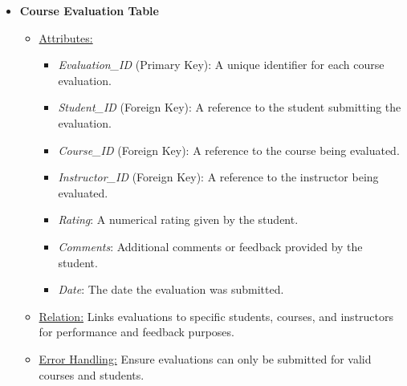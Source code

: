 \documentclass[12pt]{article}
\begin{document}
\begin{itemize}
    \item \textbf{Course Evaluation Table}
    \begin{itemize}
        \item \underline{Attributes:}
        \begin{itemize}
            \item \textit{Evaluation\_ID} (Primary Key): A unique identifier for each course evaluation.
            \item \textit{Student\_ID} (Foreign Key): A reference to the student submitting the evaluation.
            \item \textit{Course\_ID} (Foreign Key): A reference to the course being evaluated.
            \item \textit{Instructor\_ID} (Foreign Key): A reference to the instructor being evaluated.
            \item \textit{Rating}: A numerical rating given by the student.
            \item \textit{Comments}: Additional comments or feedback provided by the student.
            \item \textit{Date}: The date the evaluation was submitted.
        \end{itemize}
        \item \underline{Relation:} Links evaluations to specific students, courses, and instructors for performance and feedback purposes.
        \item \underline{Error Handling:} Ensure evaluations can only be submitted for valid courses and students.
    \end{itemize}
    
\end{itemize}
\end{document}
